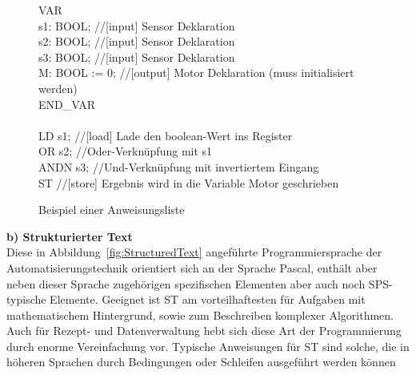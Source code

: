 	\begin{figure}[h!]
		\begin{framed}
			VAR\\
			s1: BOOL; \color{gray}//[input] Sensor Deklaration\\ \color{black}
			s2: BOOL; \color{gray}//[input] Sensor Deklaration\\ \color{black}
			s3: BOOL; \color{gray}//[input] Sensor Deklaration\\ \color{black}
			M: BOOL := 0; \color{gray}//[output] Motor Deklaration (muss initialisiert werden)\\ \color{black}
			END\_VAR\\\\
			LD s1; \color{gray}//[load] Lade den boolean-Wert ins Register\\ \color{black}
			OR s2; \color{gray}//Oder-Verknüpfung mit s1\\ \color{black}
			ANDN s3; \color{gray}//Und-Verknüpfung mit invertiertem Eingang\\ \color{black}
			ST \color{gray}//[store] Ergebnis wird in die Variable Motor geschrieben\\
		\end{framed}
		\caption{Beispiel einer Anweisungsliste}
		\label{fig:Anweisungsliste}
	\end{figure}
	
	\color{black}
	\textbf{b) Strukturierter Text}\\
	
	Diese in Abbildung~\ref{fig:StructuredText} angeführte Programmiersprache der Automatisierungstechnik orientiert sich an der Sprache Pascal, enthält aber neben dieser Sprache zugehörigen spezifischen Elementen aber auch noch SPS-typische Elemente. Geeignet ist ST am vorteilhaftesten für Aufgaben mit mathematischem Hintergrund, sowie zum Beschreiben komplexer Algorithmen. Auch für Rezept- und Datenverwaltung hebt sich diese Art der Programmierung durch enorme Vereinfachung vor. Typische Anweisungen für ST sind solche, die in höheren Sprachen durch Bedingungen oder Schleifen ausgeführt werden können \cite{grundlagen_automatisierungstechnik}
	
